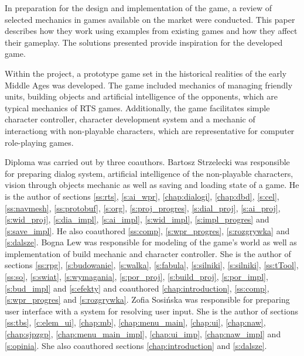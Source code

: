 In preparation for the design and implementation of the game, a review of selected mechanics in games available
on the market were conducted. This paper describes how they work using examples from existing games and how
they affect their gameplay. The solutions presented provide inspiration for the developed game.

Within the project, a prototype game set in the historical realities of the early Middle Ages was developed. The game
included mechanics of managing friendly units, building objects and artificial intelligence of the opponents, which are
typical mechanics of RTS games. Additionally, the game facilitates simple character controller, character development
system and a mechanic of interactiong with non-playable characters, which are representative for computer role-playing games.

Diploma was carried out by three coauthors. Bartosz Strzelecki was responsible for preparing dialog system, artificial
intelligence of the non-playable characters, vision through objects mechanic as well as saving and loading state of a game.
He is the author of sections \ref{ss:rts},
\ref{s:ai_wpr}, \ref{chap:dialogi}, \ref{chap:dbd}, \ref{s:cel}, \ref{ss:navmesh}, \ref{ss:protobuf}, \ref{s:org}, \ref{s:proj_progres},
\ref{s:dial_proj}, \ref{s:ai_proj}, \ref{s:wid_proj}, \ref{s:dia_impl}, \ref{s:ai_impl}, \ref{s:wid_impl}, \ref{s:impl_progres} and
\ref{s:save_impl}. He also coauthored \ref{ss:comp}, \ref{s:wpr_progres}, \ref{s:rozgrywka} and \ref{s:dalsze}. Bogna Lew
was responsible for modeling of the game's world as well as implementation of build mechanic and character controller. She
is the author of sections \ref{ss:rpg}, \ref{s:budowanie}, \ref{s:walka}, \ref{s:fabula}, \ref{s:silniki}, \ref{s:silniki},
\ref{ss:tTool}, \ref{ss:so}, \ref{s:swiat}, \ref{s:wymagania}, \ref{s:por_proj}, \ref{s:build_proj}, \ref{s:por_impl}, \ref{s:bud_impl} and
\ref{s:efekty} and coauthored \ref{chap:introduction}, \ref{ss:comp}, \ref{s:wpr_progres} and \ref{s:rozgrywka}.
Zofia Sosińska was responsible for preparing user interface with a system for resolving user input. She is the author of
sections \ref{ss:tbs}, \ref{c:elem_ui}, \ref{chap:mb},
\ref{chap:menu_main}, \ref{chap:ui}, \ref{chap:naw}, \ref{chap:sjpzgp}, \ref{chap:menu_main_impl}, \ref{chap:ui_imp},
\ref{chap:naw_impl} and  \ref{s:opinia}. She also coauthored sections \ref{chap:introduction} and \ref{s:dalsze}.